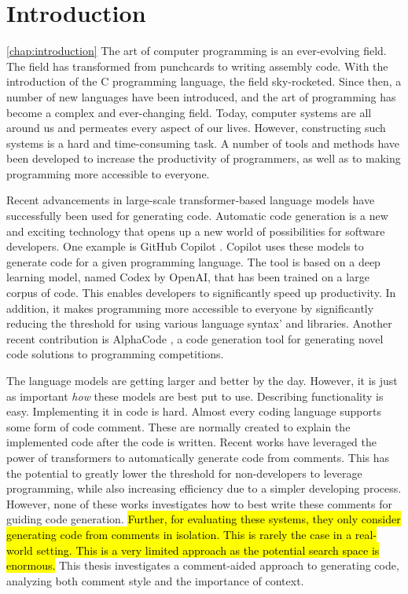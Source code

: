 \chapter{Introduction}
\cref{chap:introduction}
The art of computer programming is an ever-evolving field. The field has transformed from punchcards to writing assembly code. With the introduction of the C programming language, the field sky-rocketed. Since then, a number of new languages have been introduced, and the art of programming has become a complex and ever-changing field. Today, computer systems are all around us and permeates every aspect of our lives. However, constructing such systems is a hard and time-consuming task. A number of tools and methods have been developed to increase the productivity of programmers, as well as to making programming more accessible to everyone. 

Recent advancements in large-scale transformer-based language models have successfully been used for generating code. Automatic code generation is a new and exciting technology that opens up a new world of possibilities for software developers. One example is GitHub Copilot \cite{copilot}. Copilot uses these models to generate code for a given programming language. The tool is based on a deep learning model, named Codex \cite{chen2021codex} by OpenAI, that has been trained on a large corpus of code. This enables developers to significantly speed up productivity. In addition, it makes programming more accessible to everyone by significantly reducing the threshold for using various language syntax' and libraries. Another recent contribution is AlphaCode \cite{alphacode}, a code generation tool for generating novel code solutions to programming competitions.

The language models are getting larger and better by the day. However, it is just as important \textit{how} these models are best put to use. Describing functionality is easy. Implementing it in code is hard. Almost every coding language supports some form of code comment. These are normally created to explain the implemented code after the code is written. Recent works \cite{chen2021codex,colin2020pymt5} have leveraged the power of transformers to automatically generate code from comments. This has the potential to greatly lower the threshold for non-developers to leverage programming, while also increasing efficiency due to a simpler developing process. However, none of these works investigates how to best write these comments for guiding code generation.  \hl{Further, for evaluating these systems, they only consider generating code from comments in isolation. This is rarely the case in a real-world setting. This is a very limited approach as the potential search space is enormous.} This thesis investigates a comment-aided approach to generating code, analyzing both comment style and the importance of context.

